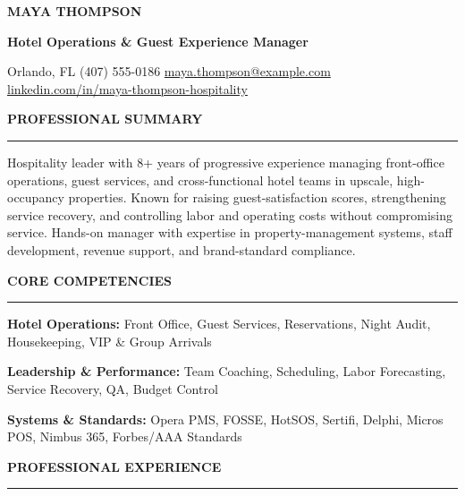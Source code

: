 \documentclass[10pt,letterpaper]{article}
\newcommand{\resumesection}[1]{%
  \vspace{6pt}%
  {\large\bfseries\color{navy}\MakeUppercase{#1}}\par
  \vspace{1.5pt}%
  {\color{navy}\rule{\linewidth}{1.05pt}}\par
  \vspace{3pt}%
}
\begin{document}
\color{black}

\begin{center}
  {\fontsize{25}{28}\selectfont\bfseries\color{navy} MAYA THOMPSON}\par
  \vspace{1.5pt}
  {\large\bfseries\color{slate} Hotel Operations \& Guest Experience Manager}\par
  \vspace{4pt}
  \small
  Orlando, FL \enspace\textcolor{rulegray}{\textbar}\enspace
  (407) 555-0186 \enspace\textcolor{rulegray}{\textbar}\enspace
  \href{mailto:maya.thompson@example.com}{maya.thompson@example.com} \enspace\textcolor{rulegray}{\textbar}\enspace
  \href{https://www.linkedin.com/in/maya-thompson-hospitality}{linkedin.com/in/maya-thompson-hospitality}
\end{center}

\resumesection{Professional Summary}
Hospitality leader with 8+ years of progressive experience managing front-office operations, guest services, and cross-functional hotel teams in upscale, high-occupancy properties. Known for raising guest-satisfaction scores, strengthening service recovery, and controlling labor and operating costs without compromising service. Hands-on manager with expertise in property-management systems, staff development, revenue support, and brand-standard compliance.

\resumesection{Core Competencies}
\textbf{Hotel Operations:} Front Office, Guest Services, Reservations, Night Audit, Housekeeping, VIP \& Group Arrivals\par
\vspace{1.5pt}
\textbf{Leadership \& Performance:} Team Coaching, Scheduling, Labor Forecasting, Service Recovery, QA, Budget Control\par
\vspace{1.5pt}
\textbf{Systems \& Standards:} Opera PMS, FOSSE, HotSOS, Sertifi, Delphi, Micros POS, Nimbus 365, Forbes/AAA Standards

\resumesection{Professional Experience}
\end{document}
